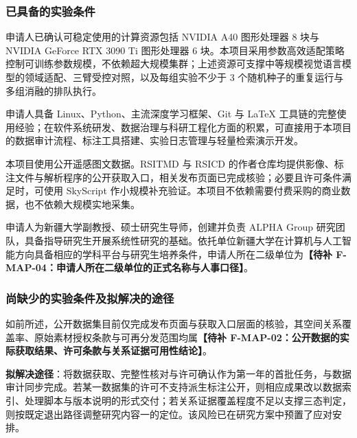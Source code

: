 \justifying
\NSFCBodyText

\subsubsection{已具备的实验条件}


申请人已确认可稳定使用的计算资源包括 NVIDIA A40 图形处理器 8 块与 NVIDIA GeForce RTX 3090 Ti 图形处理器 6 块。本项目采用参数高效适配策略控制可训练参数规模，不依赖超大规模集群；上述资源可支撑中等规模视觉语言模型的领域适配、三臂受控对照，以及每组实验不少于 3 个随机种子的重复运行与多组消融的排队执行。


申请人具备 Linux、Python、主流深度学习框架、Git 与 \LaTeX{} 工具链的完整使用经验；在软件系统研发、数据治理与科研工程化方面的积累，可直接用于本项目的数据审计流程、标注工具搭建、实验日志管理与轻量检索演示开发。


本项目使用公开遥感图文数据。RSITMD\cite{yuan2022amfmn} 与 RSICD\cite{lu2018rsicd} 的作者仓库均提供影像、标注文件与解析程序的公开获取入口，相关发布页面已完成核验；必要且许可条件满足时，可使用 SkyScript\cite{wang2024skyscript} 作小规模补充验证。本项目不依赖需要付费采购的商业数据，也不依赖大规模实地采集。


申请人为新疆大学副教授、硕士研究生导师，创建并负责 ALPHA Group 研究团队，具备指导研究生开展系统性研究的基础。依托单位新疆大学在计算机与人工智能方向具备相应的学科平台与研究生培养条件，申请人所在二级单位为\textbf{【待补 F-MAP-04：申请人所在二级单位的正式名称与人事口径】}。

\subsubsection{尚缺少的实验条件及拟解决的途径}


如前所述，公开数据集目前仅完成发布页面与获取入口层面的核验，其空间关系覆盖率、原始素材授权条款与可再分发范围均属\textbf{【待补 F-MAP-02：公开数据的实际获取结果、许可条款与关系证据可用性结论】}。

\textbf{拟解决途径}：将数据获取、完整性核对与许可确认作为第一年的首批任务，与数据审计同步完成。若某一数据集的许可不支持派生标注公开，则相应成果改以数据索引、处理脚本与版本说明的形式交付；若关系证据覆盖程度不足以支撑三态判定，则按既定退出路径调整研究内容一的定位。该风险已在研究方案中预置了应对安排。

